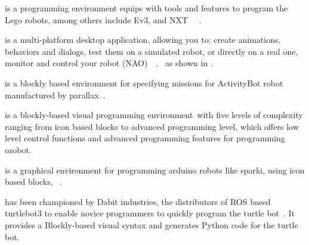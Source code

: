 \parhead{\lego} is a programming environment equips with tools and features to program the Lego robots, among others include Ev3, and NXT %
\, ~\cite{LEGO,alternativeLEGO}. %

\parhead{\choregraphe} is a multi-platform desktop application, allowing you to: create animations, behaviors and dialogs, test them on a simulated robot, or directly on a real one, monitor and control your robot (NAO)\, ~\cite{choregraphe,Monceaux2009}, %
\,\cite{Miskam2014} as shown in .

\parhead{\blocklyprop} is a blockly based environment for specifying missions for ActivityBot robot manufactured by parallax %
\,\cite{Parallax}.

\parhead{\ozoblockly} is a blockly-based visual programming environment\,\cite{ozobot} with five levels of complexity ranging from icon based blocks to advanced programming level, which offers low level control functions and advanced programming features for programming ozobot.%
 
\parhead{\minibloq} is a graphical environment for programming arduino robots like sparki, using icon based blocks, %
~\cite{miniBloq}. %
  
\parhead{\turtlebot} has been championed by Dabit industries, the distributors of ROS based turtlebot3 to enable novice programmers to quickly program the turtle bot%
\,\cite{turtlebot3blockly}. It provides a Blockly-based visual syntax and generates Python code for the turtle bot. %
 
